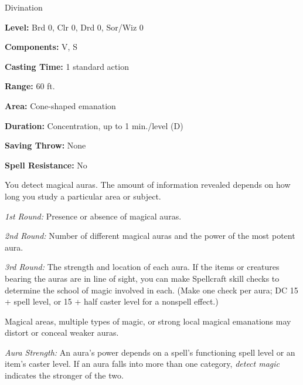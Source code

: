 
Divination

\textbf{Level:} Brd 0, Clr 0, Drd 0, Sor/Wiz 0

\textbf{Components:} V, S

\textbf{Casting Time:} 1 standard action

\textbf{Range:} 60 ft.

\textbf{Area:} Cone-shaped emanation

\textbf{Duration:} Concentration, up to 1 min./level (D)

\textbf{Saving Throw:} None

\textbf{Spell Resistance:} No

You detect magical auras. The amount of information revealed depends on how long 
you study a particular area or subject.

\textit{1st Round:} Presence or absence of magical auras.

\textit{2nd Round:} Number of different magical auras and the power of the most 
potent aura.

\textit{3rd Round:} The strength and location of each aura. If the items or creatures 
bearing the auras are in line of sight, you can make Spellcraft skill checks to 
determine the school of magic involved in each. (Make one check per aura; DC 15 
+ spell level, or 15 + half caster level for a nonspell effect.)

Magical areas, multiple types of magic, or strong local magical emanations may 
distort or conceal weaker auras.

\textit{Aura Strength:} An aura's power depends on a spell's functioning spell 
level or an item's caster level. If an aura falls into more than one category, 
\textit{detect magic} indicates the stronger of the two.

